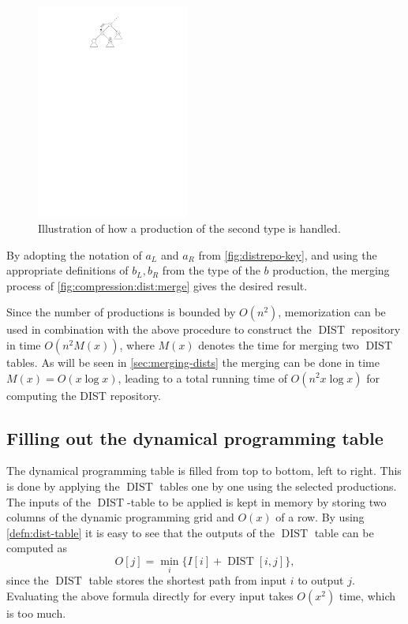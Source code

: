 \documentclass[twoside,11pt,openright]{report}
\newcommand{\DIST}{\operatorname{DIST}}
\begin{document}
\begin{description}
  \begin{figure}[h!]
    \centering
    \includegraphics[width=5cm]{images/distrepo-2nd}
    \caption{Illustration of how a production of the second type is handled.}
    \label{fig:distrepo-2nd}
  \end{figure}

  By adopting the notation of $a_L$ and $a_R$ from \cref{fig:distrepo-key}, and using the appropriate definitions of $b_L, b_R$ from the type of the $b$ production, the merging process of \cref{fig:compression:dist:merge} gives the desired result.
  \enlargethispage{\baselineskip}
\end{description}
Since the number of productions is bounded by $O(n^2)$, memorization can be used in combination with the above procedure to construct the $\DIST$ repository in time $O(n^2 M(x))$, where $M(x)$ denotes the time for merging two $\DIST$ tables. As will be seen in \cref{sec:merging-dists} the merging can be done in time $M(x) = O(x\log{x})$, leading to a total running time of $O(n^2x\log{x})$ for computing the DIST repository.

\subsection{Filling out the dynamical programming table}
\label{sec:algorithm:filling-grid-overview}
The dynamical programming table is filled from top to bottom, left to right. This is done by applying the $\DIST$ tables one by one using the selected productions. The inputs of the $\DIST$-table to be applied is kept in memory by storing two columns of the dynamic programming grid and $O(x)$ of a row. By using \cref{defn:dist-table} it is easy to see that the outputs of the $\DIST$ table can be computed as
\begin{equation}
  \label{eqn:dist-application}
  O[j] = \min_i \{ I[i] + \DIST[i, j] \},
\end{equation}
since the $\DIST$ table stores the shortest path from input $i$ to output $j$. Evaluating the above formula directly for every input takes $O(x^2)$ time, which is too much.
\end{document}
